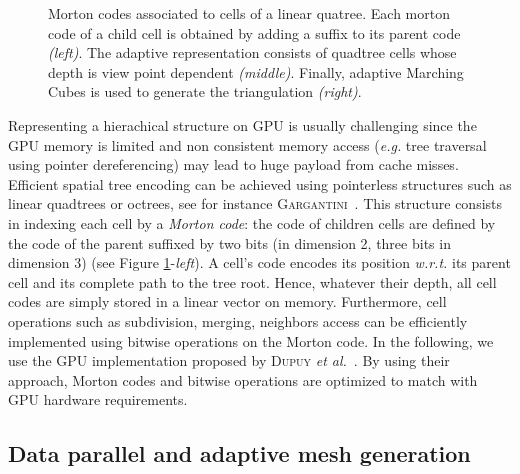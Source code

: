 \documentclass{llncs}
\newcommand{\wrt}{\emph{w.r.t.} }
\begin{document}
\begin{figure}[!htbp]
  \begin{center}
  \end{center}
\caption{Morton codes associated to cells of a linear quatree. Each
   morton code of a child cell is obtained by adding a suffix to its
  parent code \emph{(left)}. The adaptive representation consists of
  quadtree cells whose depth is view point dependent
  \emph{(middle)}. Finally, adaptive Marching Cubes is used to
  generate the triangulation \emph{(right)}.}
\label{fig_quadtree_partitionning}
\end{figure}

Representing a hierachical structure on GPU is usually challenging since the GPU
memory is limited and non consistent %
memory access (\emph{e.g.} tree traversal using pointer dereferencing) may lead
to huge payload from cache misses.  Efficient spatial tree encoding can be
achieved using pointerless structures such as linear quadtrees or octrees, see
for instance \textsc{Gargantini}~\cite{gargantini1982effective}. This structure
consists in indexing each cell by a \emph{Morton code}: the code of children
cells are defined by the code of the parent suffixed by two bits (in dimension
2, three bits in dimension 3) (see Figure
\ref{fig_quadtree_partitionning}-\emph{left}). A cell's code encodes its
position \wrt its parent cell and its complete path to the tree root. Hence,
whatever their depth, all cell codes are simply stored in a linear vector on
memory. Furthermore, cell operations such as subdivision, merging, neighbors
access can be efficiently implemented using bitwise operations on the Morton
code. In the following, we use the GPU implementation proposed by \textsc{Dupuy}
\textit{et al.}~\cite{dupuy2014quadtrees}. By using their approach, Morton codes
and bitwise operations are optimized to match with GPU hardware requirements.

\subsection{Data parallel and adaptive mesh generation}
\end{document}

